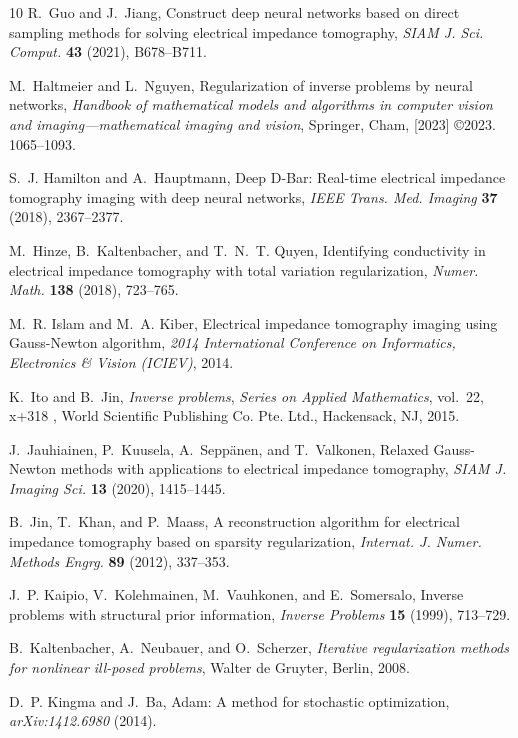\documentclass[11pt]{article}
\begin{document}
\begin{thebibliography}{10}
	R.~Guo and J.~Jiang, Construct deep neural networks based on direct sampling
	methods for solving electrical impedance tomography, \textit{SIAM J. Sci.
		Comput.} \textbf{43} (2021), B678--B711.
	
	M.~Haltmeier and L.~Nguyen, Regularization of inverse problems by neural
	networks, \textit{Handbook of mathematical models and algorithms in computer
		vision and imaging---mathematical imaging and vision}, Springer, Cham, [2023]
	\copyright 2023. 1065--1093.
	
	S.~J. Hamilton and A.~Hauptmann, Deep {D}-{B}ar: Real-time electrical impedance
	tomography imaging with deep neural networks, \textit{IEEE Trans. Med.
		Imaging} \textbf{37} (2018), 2367--2377.
	
	M.~Hinze, B.~Kaltenbacher, and T.~N.~T. Quyen, Identifying conductivity in
	electrical impedance tomography with total variation regularization,
	\textit{Numer. Math.} \textbf{138} (2018), 723--765.
	
	M.~R. Islam and M.~A. Kiber, Electrical impedance tomography imaging using
	{G}auss-{N}ewton algorithm, \textit{2014 International Conference on
		Informatics, Electronics \& Vision (ICIEV)}, 2014.
	
	K.~Ito and B.~Jin, \textit{Inverse problems}, \textit{Series on Applied
		Mathematics}, vol.~22, x+318 , World Scientific Publishing Co. Pte. Ltd.,
	Hackensack, NJ, 2015.
	
	J.~Jauhiainen, P.~Kuusela, A.~Sepp\"anen, and T.~Valkonen, Relaxed
	{G}auss-{N}ewton methods with applications to electrical impedance
	tomography, \textit{SIAM J. Imaging Sci.} \textbf{13} (2020), 1415--1445.
	
	B.~Jin, T.~Khan, and P.~Maass, A reconstruction algorithm for electrical
	impedance tomography based on sparsity regularization, \textit{Internat. J.
		Numer. Methods Engrg.} \textbf{89} (2012), 337--353.
	
	J.~P. Kaipio, V.~Kolehmainen, M.~Vauhkonen, and E.~Somersalo, Inverse problems
	with structural prior information, \textit{Inverse Problems} \textbf{15}
	(1999), 713--729.
	
	B.~Kaltenbacher, A.~Neubauer, and O.~Scherzer, \textit{Iterative regularization
		methods for nonlinear ill-posed problems}, Walter de Gruyter, Berlin, 2008.
	
	D.~P. Kingma and J.~Ba, Adam: A method for stochastic optimization,
	\textit{arXiv:1412.6980}  (2014).
	

\end{thebibliography}
\end{document}
